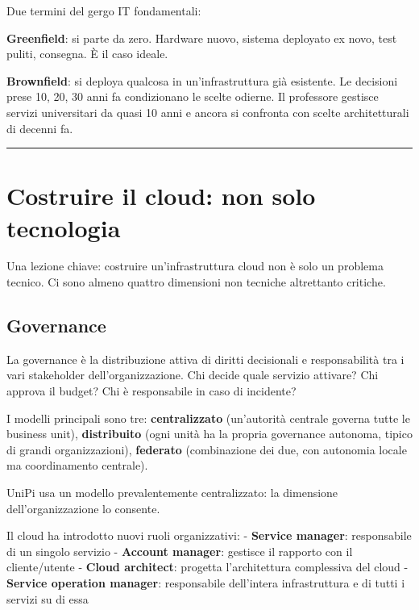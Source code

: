 \documentclass[
  italian,
  openany]{book}
\begin{document}
Due termini del gergo IT fondamentali:

\textbf{Greenfield}: si parte da zero. Hardware nuovo, sistema deployato
ex novo, test puliti, consegna. È il caso ideale.

\textbf{Brownfield}: si deploya qualcosa in un'infrastruttura già
esistente. Le decisioni prese 10, 20, 30 anni fa condizionano le scelte
odierne. Il professore gestisce servizi universitari da quasi 10 anni e
ancora si confronta con scelte architetturali di decenni fa.

\begin{center}\rule{0.5\linewidth}{0.5pt}\end{center}

\section{Costruire il cloud: non solo
tecnologia}\label{costruire-il-cloud-non-solo-tecnologia}

Una lezione chiave: costruire un'infrastruttura cloud non è solo un
problema tecnico. Ci sono almeno quattro dimensioni non tecniche
altrettanto critiche.

\subsection{Governance}\label{governance}

La governance è la distribuzione attiva di diritti decisionali e
responsabilità tra i vari stakeholder dell'organizzazione. Chi decide
quale servizio attivare? Chi approva il budget? Chi è responsabile in
caso di incidente?

I modelli principali sono tre: \textbf{centralizzato} (un'autorità
centrale governa tutte le business unit), \textbf{distribuito} (ogni
unità ha la propria governance autonoma, tipico di grandi
organizzazioni), \textbf{federato} (combinazione dei due, con autonomia
locale ma coordinamento centrale).

UniPi usa un modello prevalentemente centralizzato: la dimensione
dell'organizzazione lo consente.

Il cloud ha introdotto nuovi ruoli organizzativi: - \textbf{Service
manager}: responsabile di un singolo servizio - \textbf{Account
manager}: gestisce il rapporto con il cliente/utente - \textbf{Cloud
architect}: progetta l'architettura complessiva del cloud -
\textbf{Service operation manager}: responsabile dell'intera
infrastruttura e di tutti i servizi su di essa
\end{document}
